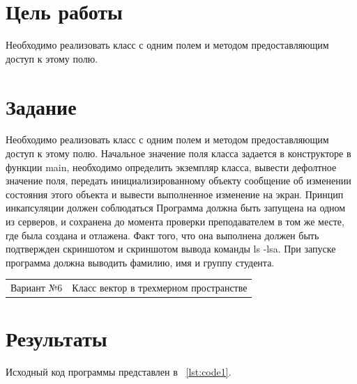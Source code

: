 \documentclass[a4paper, 14pt]{extarticle}
\begin{document}
\renewcommand{\ttdefault}{pcr}

\setlength{\tabcolsep}{3pt}
\newpage
\setcounter{page}{2}

\section{Цель работы}\label{Sect::point}
Необходимо реализовать класс с одним полем и методом предоставляющим доступ к
этому полю.


\section{Задание}\label{Sect::task}

Необходимо реализовать класс с одним полем и методом предоставляющим доступ к
этому полю. Начальное значение поля класса задается в конструкторе в функции main,
необходимо определить экземпляр класса, вывести дефолтное значение поля, передать
инициализированному объекту сообщение об изменении состояния этого объекта и вывести
выполненное изменение на экран. Принцип инкапсуляции должен соблюдаться
Программа должна быть запущена на одном из серверов, и сохранена до момента
проверки преподавателем в том же месте, где была создана и отлажена. Факт того, что она
выполнена должен быть подтвержден скриншотом и скриншотом вывода команды ls -lsa.
При запуске программа должна выводить фамилию, имя и группу студента.

\begin{tabular}{ l | c }
Вариант №6 & Класс вектор в трехмерном пространстве
\end{tabular}



\section{Результаты}\label{Sect::res}

Исходный код программы представлен в ~\ref{lst:code1}.
\end{document}
